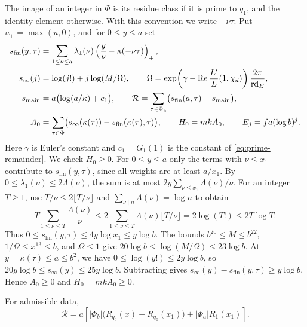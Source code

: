 The image of an integer in \(\Phi\) is its residue class if it is prime
to \(q_1\), and the identity element otherwise. With this convention we
write \(-\nu\tau\). Put \(u_+=\max(u,0)\), and for \(0\le y\le a\) set
\begin{align*}
 s_{\mathrm{fin}}(y,\tau)
   &=\sum_{1\le\nu\le a}\lambda_1(\nu)
      \left(\frac{y}{\nu}-\kappa(-\nu\tau)\right)_+,\\
 s_{\infty}(j)&=\log(j!)+j\log(M/\Omega),\qquad
 \Omega=
    \exp\!\left(\gamma-\operatorname{Re}\frac{L'}{L}(1,\chi_d)\right)
        \frac{2\pi}{\mathrm{rd}_E},\\
 s_{\mathrm{main}}&=a\bigl(\log(a/\bar\kappa)+c_1\bigr),\qquad
 \mathcal R=\sum_{\tau\in\Phi_a}\bigl(s_{\mathrm{fin}}(a,\tau)-s_{\mathrm{main}}\bigr),\\
 A_0&=\sum_{\tau\in\Phi}
       \bigl(s_\infty(\kappa(\tau))-s_{\mathrm{fin}}(\kappa(\tau),\tau)\bigr),
 \qquad H_0=mkA_0,\qquad E_j=fa(\log b)^j .
\end{align*}
Here \(\gamma\) is Euler's constant and \(c_1=G_1(1)\) is the constant of
\eqref{eq:prime-remainder}.
We check \(H_0\ge0\). For \(0\le y\le a\) only the terms with
\(\nu\le x_1\) contribute to \(s_{\mathrm{fin}}(y,\tau)\), since all weights
are at least \(a/x_1\). By \(0\le\lambda_1(\nu)\le2\Lambda(\nu)\),
the sum is at most \(2y\sum_{\nu\le x_1}\Lambda(\nu)/\nu\).
For an integer \(T\ge1\), use \(T/\nu\le2\lfloor T/\nu\rfloor\) and
\(\sum_{\nu\mid n}\Lambda(\nu)=\log n\) to obtain
\[
 T\sum_{1\le\nu\le T}\frac{\Lambda(\nu)}{\nu}
 \le2\sum_{1\le\nu\le T}\Lambda(\nu)\lfloor T/\nu\rfloor
 =2\log(T!)\le2T\log T.
\]
Thus \(0\le s_{\mathrm{fin}}(y,\tau)\le4y\log x_1\le y\log b\).
The bounds \(b^{20}\le M\le b^{22}\), \(1/\Omega\le x^{13}\le b\), and
\(\Omega\le1\) give \(20\log b\le\log(M/\Omega)\le23\log b\).
At \(y=\kappa(\tau)\le a\le b^2\), we have \(0\le\log(y!)\le2y\log b\),
so \(20y\log b\le s_\infty(y)\le25y\log b\).
Subtracting gives \(s_\infty(y)-s_{\mathrm{fin}}(y,\tau)\ge y\log b\).
Hence \(A_0\ge0\) and \(H_0=mkA_0\ge0\).

\begin{proposition}\label{prop:total-remainder}
For admissible data,
\begin{equation}\label{eq:total-remainder}
 \mathcal R =
 a\left[
 |\Phi_b|\bigl(R_{q_0}(x)-R_{q_0}(x_1)\bigr)
 +|\Phi_a|R_1(x_1)
 \right].
\end{equation}
\end{proposition}


